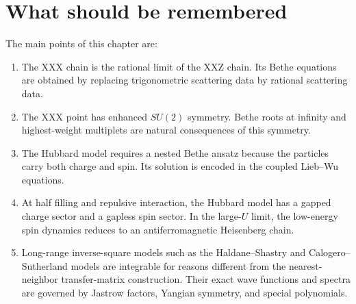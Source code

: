\section{What should be remembered}
\label{sec:further-what-to-remember}

The main points of this chapter are:
\begin{enumerate}[label=(\roman*)]
    \item The XXX chain is the rational limit of the XXZ chain.  Its Bethe
    equations are obtained by replacing trigonometric scattering data by rational
    scattering data.
    \item The XXX point has enhanced $SU(2)$ symmetry.  Bethe roots at infinity
    and highest-weight multiplets are natural consequences of this symmetry.
    \item The Hubbard model requires a nested Bethe ansatz because the particles
    carry both charge and spin.  Its solution is encoded in the coupled
    Lieb--Wu equations.
    \item At half filling and repulsive interaction, the Hubbard model has a
    gapped charge sector and a gapless spin sector.  In the large-$U$ limit, the
    low-energy spin dynamics reduces to an antiferromagnetic Heisenberg chain.
    \item Long-range inverse-square models such as the Haldane--Shastry and
    Calogero--Sutherland models are integrable for reasons different from the
    nearest-neighbor transfer-matrix construction.  Their exact wave functions
    and spectra are governed by Jastrow factors, Yangian symmetry, and special
    polynomials.
\end{enumerate}

